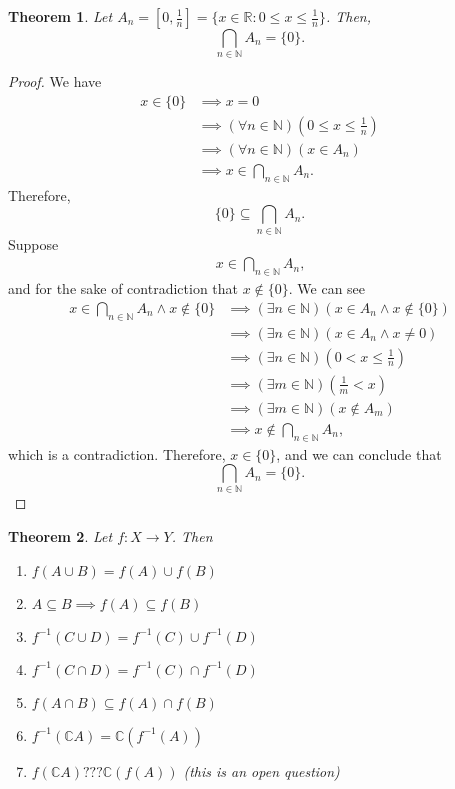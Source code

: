\documentclass[12pt,a4paper]{article}
\author{Jeremiah Givens}
\theoremstyle{theorem}
\newtheorem{theorem}{Theorem}
\theoremstyle{definition}
\begin{document}
\begin{theorem}
Let $A_n = \left[ 0, \frac{1}{n}\right] = \{ x \in \mathbb{R} : 0 \leq x \leq \frac{1}{n} \}$. Then, 
\begin{equation*}
\bigcap_{n \in \mathbb{N}} A_n = \{0 \} \text{.}
\end{equation*}
\end{theorem}
\begin{proof}
We have 
\begin{align*}
x \in \{0 \} &\implies x = 0 \\
&\implies (\forall n \in \mathbb{N})(0 \leq x \leq \frac{1}{n})\\
&\implies (\forall n \in \mathbb{N})(x \in A_n)\\
&\implies x \in \bigcap_{n \in \mathbb{N}} A_n \text{.}
\end{align*}
Therefore, 
\begin{equation*}
\{ 0 \} \subseteq \bigcap_{n \in \mathbb{N}} A_n.
\end{equation*}
Suppose
\begin{align*}
x \in \bigcap_{n \in \mathbb{N}} A_n \text{,}
\end{align*}
and for the sake of contradiction that $x \not \in \{ 0 \}$.
We can see
\begin{align*}
x \in \bigcap_{n \in \mathbb{N}} A_n \land x \not \in \{0 \} &\implies (\exists n \in \mathbb{N}) (x \in A_n \land x\not \in \{0 \})\\
&\implies (\exists n \in \mathbb{N}) (x \in A_n \land x \neq 0)\\
&\implies (\exists n \in \mathbb{N}) (0 < x \leq \frac{1}{n})\\
&\implies (\exists m \in \mathbb{N})(\frac{1}{m} < x)\\
&\implies (\exists m \in \mathbb{N})(x \not \in A_m)\\
&\implies x \not \in \bigcap_{n \in \mathbb{N}} A_n \text{,}
\end{align*}
which is a contradiction. Therefore, $x \in \{0 \}$, and we can conclude that 
\begin{equation*}
\bigcap_{n \in \mathbb{N}} A_n = \{0 \} \text{.}
\end{equation*}
\end{proof}

\begin{theorem}
Let $f: X \to Y$. Then
\begin{enumerate}
\item $f(A \cup B) = f(A) \cup f(B)$
\item $A \subseteq B \implies f(A) \subseteq f(B)$
\item $f^{-1}(C \cup D) = f^{-1}(C) \cup f^{-1}(D)$
\item $f^{-1}(C \cap D) = f^{-1}(C) \cap f^{-1}(D)$
\item $f(A \cap B) \subseteq f(A) \cap f(B)$
\item $f^{-1}(\mathbb{C}A) = \mathbb{C} (f^{-1}(A))$
\item $f(\mathbb{C}A) ??? \mathbb{C}(f(A))$ (this is an open question)
\end{enumerate}
\end{theorem}
\end{document}
